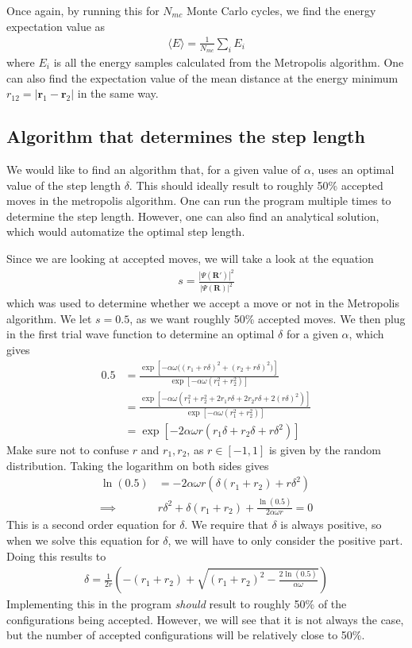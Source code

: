 \documentclass[12pt]{article}
\begin{document}
Once again, by running this for $N_{mc}$ Monte Carlo cycles, we find the energy expectation value as
\begin{align*}
\langle E \rangle = \displaystyle \frac{1}{N_{mc}}\sum_i E_i
\end{align*}
where $E_i$ is all the energy samples calculated from the Metropolis algorithm. One can also find the expectation value of the mean distance at the energy minimum $r_{12} = |\mathbf{r}_1 - \mathbf{r}_2|$ in the same way.

\subsection{Algorithm that determines the step length}
We would like to find an algorithm that, for a given value of $\alpha$, uses an optimal value of the step length $\delta$. This should ideally result to roughly 50\% accepted moves in the metropolis algorithm. One can run the program multiple times to determine the step length. However, one can also find an analytical solution, which would automatize the optimal step length.

Since we are looking at accepted moves, we will take a look at the equation
\begin{align*}
s = \frac{|\Psi(\mathbf{R'})|^2}{|\Psi(\mathbf{R})|^2}
\end{align*}
which was used to determine whether we accept a move or not in the Metropolis algorithm. We let $s = 0.5$, as we want roughly 50\% accepted moves. We then plug in the first trial wave function to determine an optimal $\delta$ for a given $\alpha$, which gives
\begin{align*}
0.5 &= \frac{\exp\left[-\alpha \omega \big((r_1+r\delta)^2 + (r_2 + r\delta)^2\big)\right]}{\exp\left[-\alpha \omega(r_1^2+r_2^2) \right]} \\
&= \frac{\exp\left[-\alpha \omega(r_1^2 + r_2^2 + 2r_1r\delta + 2r_2r\delta + 2(r\delta)^2)\right]}{\exp\left[-\alpha \omega(r_1^2+r_2^2) \right]}\\
&= \exp\left[-2\alpha\omega r(r_1\delta + r_2\delta + r\delta^2) \right]
\end{align*}
Make sure not to confuse $r$ and $r_1, r_2$, as $r \in [-1,1]$ is given by the random distribution. Taking the logarithm on both sides gives
\begin{align*}
\ln(0.5) &= -2\alpha\omega r\left(\delta(r_1+r_2) + r\delta^2\right) \\
\implies & r\delta^2 + \delta(r_1 + r_2) + \frac{\ln(0.5)}{2\alpha \omega r} = 0
\end{align*}
This is a second order equation for $\delta$. We require that $\delta$ is always positive, so when we solve this equation for $\delta$, we will have to only consider the positive part. Doing this results to
\begin{align}
\delta = \frac{1}{2r}\left(-(r_1 + r_2) + \sqrt{(r_1+r_2)^2 - \frac{2\ln(0.5)}{\alpha \omega}}\right)
\label{eq:step_length_algo}
\end{align}
Implementing this in the program \emph{should} result to roughly 50\% of the configurations being accepted. However, we will see that it is not always the case, but the number of accepted configurations will be relatively close to 50\%.
\end{document}
